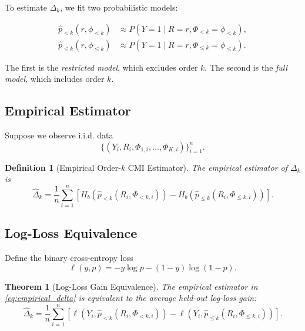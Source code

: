 \documentclass[11pt]{article}
\newtheorem{definition}{Definition}
\newtheorem{theorem}{Theorem}
\newcommand{\1}{\mathbf{1}}
\begin{document}
To estimate $\Delta_k$, we fit two probabilistic models:

\begin{align}
\hat p_{<k}(r,\phi_{<k})
&\approx
P(Y=1 \mid R=r,\Phi_{<k}=\phi_{<k}),
\label{eq:restricted_model}
\\
\hat p_{\le k}(r,\phi_{\le k})
&\approx
P(Y=1 \mid R=r,\Phi_{\le k}=\phi_{\le k}).
\label{eq:full_model}
\end{align}

The first is the \emph{restricted model}, which excludes order $k$.
The second is the \emph{full model}, which includes order $k$.

\subsection{Empirical Estimator}

Suppose we observe i.i.d. data
\[
\{(Y_i,R_i,\Phi_{1,i},\ldots,\Phi_{K,i})\}_{i=1}^n.
\]

\begin{definition}[Empirical Order-$k$ CMI Estimator]
The empirical estimator of $\Delta_k$ is
\begin{equation}
\hat \Delta_k
=
\frac{1}{n}
\sum_{i=1}^n
\left[
H_b\!\left( \hat p_{<k}(R_i,\Phi_{<k,i}) \right)
-
H_b\!\left( \hat p_{\le k}(R_i,\Phi_{\le k,i}) \right)
\right].
\label{eq:empirical_delta}
\end{equation}
\end{definition}

\subsection{Log-Loss Equivalence}

Define the binary cross-entropy loss
\begin{equation}
\ell(y,p) = -y\log p - (1-y)\log(1-p).
\label{eq:logloss}
\end{equation}

\begin{theorem}[Log-Loss Gain Equivalence]
The empirical estimator in \eqref{eq:empirical_delta} is equivalent to the average held-out
log-loss gain:
\begin{equation}
\hat \Delta_k
=
\frac{1}{n}
\sum_{i=1}^n
\left[
\ell\!\left(Y_i,\hat p_{<k}(R_i,\Phi_{<k,i})\right)
-
\ell\!\left(Y_i,\hat p_{\le k}(R_i,\Phi_{\le k,i})\right)
\right].
\label{eq:logloss_gain_equivalence}
\end{equation}
\end{theorem}
\end{document}
